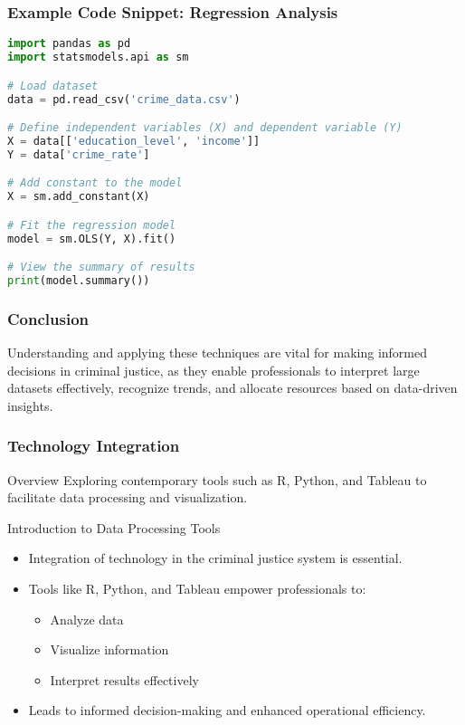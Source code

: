 \documentclass[aspectratio=169]{beamer}
\begin{document}
\begin{frame}[fragile]
    \frametitle{Example Code Snippet: Regression Analysis}
    \begin{lstlisting}[language=Python]
import pandas as pd
import statsmodels.api as sm

# Load dataset
data = pd.read_csv('crime_data.csv')

# Define independent variables (X) and dependent variable (Y)
X = data[['education_level', 'income']]
Y = data['crime_rate']

# Add constant to the model
X = sm.add_constant(X)

# Fit the regression model
model = sm.OLS(Y, X).fit()

# View the summary of results
print(model.summary())
    \end{lstlisting}
\end{frame}

\begin{frame}
    \frametitle{Conclusion}
    Understanding and applying these techniques are vital for making informed decisions 
    in criminal justice, as they enable professionals to interpret large datasets effectively, 
    recognize trends, and allocate resources based on data-driven insights.
\end{frame}

\begin{frame}
    \frametitle{Technology Integration}
    \begin{block}{Overview}
        Exploring contemporary tools such as R, Python, and Tableau to facilitate data processing and visualization.
    \end{block}
\end{frame}

\begin{frame}{Introduction to Data Processing Tools}
    \begin{itemize}
        \item Integration of technology in the criminal justice system is essential.
        \item Tools like R, Python, and Tableau empower professionals to:
        \begin{itemize}
            \item Analyze data
            \item Visualize information
            \item Interpret results effectively
        \end{itemize}
        \item Leads to informed decision-making and enhanced operational efficiency.
    \end{itemize}
\end{frame}
\end{document}
